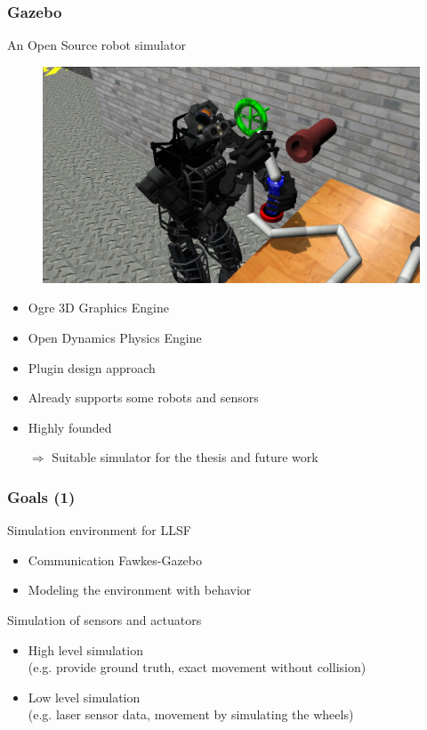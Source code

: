 \documentclass[]{beamer}
\begin{document}
\begin{frame}
\frametitle{Gazebo}
\begin{multicols}{2}
An Open Source robot simulator
\begin{figure}
\includegraphics[scale=0.125]{pics/gazebo.jpg}
\end{figure}
\begin{itemize}
\item Ogre 3D Graphics Engine %
\item Open Dynamics Physics Engine %
\item Plugin design approach
\item Already supports some robots and sensors %
\item Highly founded
\end{itemize}
\end{multicols}
\pause
\begin{itemize}
\item[$\Rightarrow$] Suitable simulator for the thesis and future work
\end{itemize}
\end{frame}

\begin{frame}
\frametitle{Goals (1)}
Simulation environment for LLSF
\begin{itemize}
\item Communication Fawkes-Gazebo
\item Modeling the environment with behavior
\end{itemize}
\pause
Simulation of sensors and actuators
\begin{itemize}
\item High level simulation\\(e.g. provide ground truth, exact movement without collision)
\item Low level simulation\\(e.g. laser sensor data, movement by simulating the wheels)
\end{itemize}
\end{frame}
\end{document}
